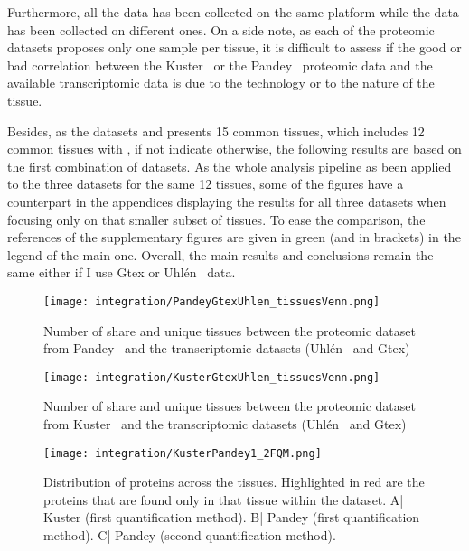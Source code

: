 Furthermore, all the  data has been
collected on the same platform while the  data has been collected on
different ones. On a side note, as each of the proteomic datasets proposes
only one sample per tissue, it is difficult to assess if the good or bad
correlation between the Kuster \etal\ or the Pandey \etal\ proteomic data
and the available transcriptomic data is due to the technology or
to the nature of the tissue.

Besides, as the datasets  and  presents 15 common
tissues, which includes 12 common tissues with , if not
indicate otherwise, the following results are based on the first combination of
datasets. As the whole analysis pipeline as been applied to the three datasets for
the same 12 tissues, some of the figures have a counterpart in the
appendices displaying the results for all three datasets when focusing only on that
smaller subset of tissues. To ease the comparison, the references of the supplementary
figures are given in green (and in brackets) in the legend of the main one.
Overall, the main results and conclusions remain the same either if I use Gtex or
Uhlén \etal\ data.




\begin{figure}[!htbp]
    \texttt{[image: integration/PandeyGtexUhlen\_tissuesVenn.png]}\centering
    \caption{\label{VennTissuePandeyGtexUhlen}Number of share and unique
    tissues between the proteomic dataset
    from Pandey \etal\ and the transcriptomic datasets (Uhlén \etal\ and Gtex)}
\end{figure}

\begin{figure}[!htbp]
    \texttt{[image: integration/KusterGtexUhlen\_tissuesVenn.png]}\centering
    \caption{\label{VennTissueKusterGtexUhlen}Number of share and unique
    tissues between the proteomic dataset
    from Kuster \etal\ and the transcriptomic datasets (Uhlén \etal\ and Gtex)}
\end{figure}


\begin{figure}[!htbp]
    \texttt{[image: integration/KusterPandey1\_2FQM.png]}\centering
    \caption{\label{KusterPandeyFQM}Distribution of proteins across the tissues.
    Highlighted in red are the proteins that are found only in that
    tissue within the dataset. A| Kuster (first quantification method).
    B| Pandey (first quantification method).
    C| Pandey (second quantification method).}
\end{figure}


